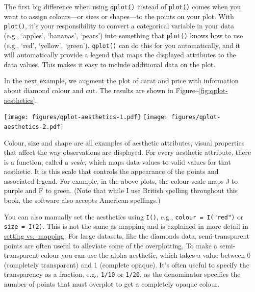 The first big difference when using \texttt{qplot()} instead of
\texttt{plot()} comes when you want to assign colours---or sizes or
shapes---to the points on your plot. With \texttt{plot()}, it's your
responsibility to convert a categorical variable in your data (e.g.,
`apples', `bananas', `pears') into something that \texttt{plot()} knows
how to use (e.g., `red', `yellow', `green'). \texttt{qplot()} can do
this for you automatically, and it will automatically provide a legend
that maps the displayed attributes to the data values. This makes it
easy to include additional data on the plot.

In the next example, we augment the plot of carat and price with
information about diamond colour and cut. The results are shown in
Figure\textasciitilde{}\ref{fig:qplot-aesthetics}.

\begin{Shaded}
\begin{Highlighting}[]
  
  
\end{Highlighting}
\end{Shaded}

\texttt{[image: figures/qplot-aesthetics-1.pdf]}
\texttt{[image: figures/qplot-aesthetics-2.pdf]}

Colour, size and shape are all examples of aesthetic attributes, visual
properties that affect the way observations are displayed. For every
aesthetic attribute, there is a function, called a \emph{scale}, which
maps data values to valid values for that aesthetic. It is this scale
that controls the appearance of the points and associated legend. For
example, in the above plots, the colour scale maps J to purple and F to
green. (Note that while I use British spelling throughout this book, the
software also accepts American spellings.)

You can also manually set the aesthetics using \texttt{I()}, e.g.,
\texttt{colour = I("red")} or \texttt{size = I(2)}. This is not the same
as mapping and is explained in more detail in
\hyperref[sub:setting-mapping]{setting vs.~mapping}. For large datasets,
like the diamonds data, semi-transparent points are often useful to
alleviate some of the overplotting. To make a semi-transparent colour
you can use the alpha aesthetic, which takes a value between 0
(completely transparent) and 1 (complete opaque). It's often useful to
specify the transparency as a fraction, e.g., \texttt{1/10} or
\texttt{1/20}, as the denominator specifies the number of points that
must overplot to get a completely opaque colour.
 

